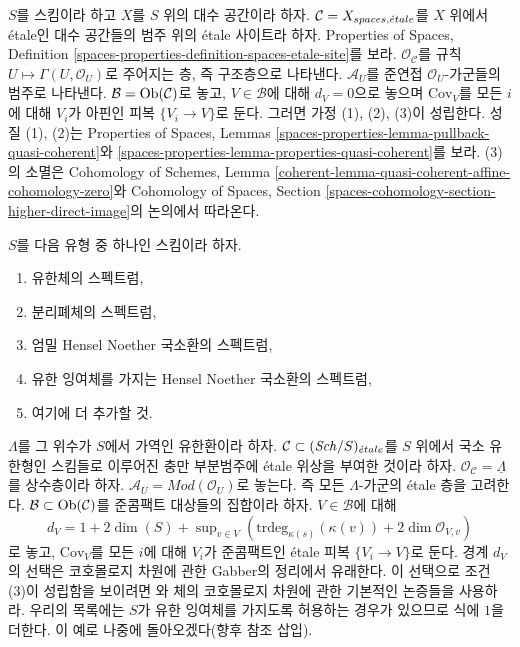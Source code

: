 \begin{example}
\label{example-quasi-coherent-spaces-etale}
$S$를 스킴이라 하고 $X$를 $S$ 위의 대수 공간이라 하자.
$\mathcal{C} = X_{spaces, {\acute{e}tale}}$를 $X$ 위에서 \'etale인 대수 공간들의
범주 위의 \'etale 사이트라 하자. Properties of Spaces, Definition
\ref{spaces-properties-definition-spaces-etale-site}를 보라.
$\mathcal{O}_\mathcal{C}$를 규칙
$U \mapsto \Gamma(U, \mathcal{O}_U)$로 주어지는 층, 즉 구조층으로
나타낸다. $\mathcal{A}_U$를 준연접 $\mathcal{O}_U$-가군들의 범주로
나타낸다. $\mathcal{B} = \mathop{\mathrm{Ob}}\nolimits(\mathcal{C})$로 놓고,
$V \in \mathcal{B}$에 대해 $d_V = 0$으로 놓으며
$\text{Cov}_V$를 모든 $i$에 대해 $V_i$가 아핀인 피복
$\{V_i \to V\}$로 둔다. 그러면 가정 (1), (2), (3)이 성립한다.
성질 (1), (2)는 Properties of Spaces, Lemmas
\ref{spaces-properties-lemma-pullback-quasi-coherent}와
\ref{spaces-properties-lemma-properties-quasi-coherent}를 보라.
(3)의 소멸은 Cohomology of Schemes, Lemma
\ref{coherent-lemma-quasi-coherent-affine-cohomology-zero}와 Cohomology of
Spaces, Section \ref{spaces-cohomology-section-higher-direct-image}의
논의에서 따라온다.
\end{example}

\begin{example}
\label{example-etale}
$S$를 다음 유형 중 하나인 스킴이라 하자.
\begin{enumerate}
\item 유한체의 스펙트럼,
\item 분리폐체의 스펙트럼,
\item 엄밀 Hensel Noether 국소환의 스펙트럼,
\item 유한 잉여체를 가지는 Hensel Noether 국소환의 스펙트럼,
\item 여기에 더 추가할 것.
\end{enumerate}
$\Lambda$를 그 위수가 $S$에서 가역인 유한환이라 하자.
$\mathcal{C} \subset (\mathit{Sch}/S)_{\acute{e}tale}$를 $S$ 위에서 국소 유한형인
스킴들로 이루어진 충만 부분범주에 \'etale 위상을 부여한 것이라 하자.
$\mathcal{O}_\mathcal{C} = \underline{\Lambda}$를 상수층이라 하자.
$\mathcal{A}_U = \textit{Mod}(\mathcal{O}_U)$로 놓는다. 즉 모든
$\Lambda$-가군의 \'etale 층을 고려한다.
$\mathcal{B} \subset \mathop{\mathrm{Ob}}\nolimits(\mathcal{C})$를 준콤팩트 대상들의 집합이라
하자. $V \in \mathcal{B}$에 대해
$$
d_V = 1 + 2\dim(S) +
\sup\nolimits_{v \in V}(\text{trdeg}_{\kappa(s)}(\kappa(v)) +
2 \dim \mathcal{O}_{V, v})
$$
로 놓고, $\text{Cov}_V$를 모든 $i$에 대해 $V_i$가 준콤팩트인
\'etale 피복 $\{V_i \to V\}$로 둔다. 경계 $d_V$의 선택은
코호몰로지 차원에 관한 Gabber의 정리에서 유래한다. 이 선택으로
조건 (3)이 성립함을 보이려면
\cite[Expos\'e VIII-A, Corollary 1.2 and Lemma 2.2]{Traveaux}와 체의
코호몰로지 차원에 관한 기본적인 논증들을 사용하라. 우리의 목록에는
$S$가 유한 잉여체를 가지도록 허용하는 경우가 있으므로 식에 $1$을
더한다. 이 예로 나중에 돌아오겠다(향후 참조 삽입).
\end{example}

